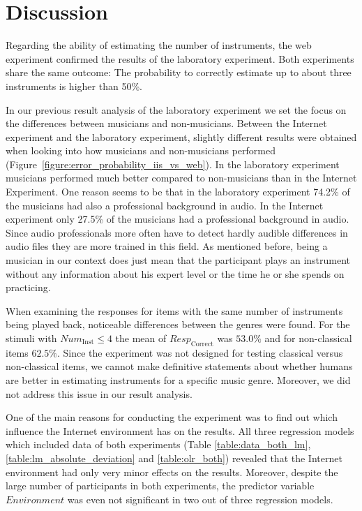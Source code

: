 \vspace{-0.1in}
\section{Discussion}\label{sec:discussion}

Regarding the ability of estimating the number of instruments, the web experiment confirmed the results of the laboratory experiment\cite{Stoter2013}. Both experiments share the same outcome: The probability to correctly estimate up to about three instruments is higher than 50\%.

In our previous result analysis of the laboratory experiment\cite{Stoter2013} we set the focus on the differences between musicians and non-musicians. Between the Internet experiment and the laboratory experiment, slightly different results were obtained when looking into how musicians and non-musicians performed (Figure~\ref{figure:error_probability_iis_vs_web}). In the laboratory experiment musicians performed much better compared to non-musicians than in the Internet Experiment. One reason seems to be that in the laboratory experiment 74.2\% of the musicians had also a professional background in audio. In the Internet experiment only 27.5\% of the musicians had a professional background in audio. Since audio professionals more often have to detect hardly audible differences in audio files they are more trained in this field. As mentioned before, being a musician in our context does just mean that the participant plays an instrument without any information about his expert level or the time he or she spends on practicing.

When examining the responses for items with the same number of instruments being played back, noticeable differences between the genres were found. For the stimuli with $\textit{Num}_{\mathrm{Inst}} \le 4$ the mean of $\textit{Resp}_{\mathrm{Correct}}$ was $53.0\%$ and for non-classical items $62.5\%$. Since the experiment was not designed for testing classical versus non-classical items, we cannot make definitive statements about whether humans are better in estimating instruments for a specific music genre. Moreover, we did not address this issue in our result analysis.

One of the main reasons for conducting the experiment was to find out which influence the Internet environment has on the results. All three regression models which included data of both experiments (Table \ref{table:data_both_lm}, \ref{table:lm_absolute_deviation} and \ref{table:olr_both}) revealed that the Internet environment had only very minor effects on the results. Moreover, despite the large number of participants in both experiments, the predictor variable $\textit{Environment}$ was even not significant in two out of three regression models.

